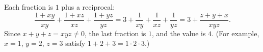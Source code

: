 Each fraction is $1$ plus a reciprocal:
\[
\dfrac{1+xy}{xy}+\dfrac{1+xz}{xz}+\dfrac{1+yz}{yz}=3+\dfrac{1}{xy}+\dfrac{1}{xz}+\dfrac{1}{yz}=3+\dfrac{z+y+x}{xyz}.
\]
Since $x+y+z=xyz\ne0$, the last fraction is $1$, and the value is $\boxed{4}$. (For example, $x=1$, $y=2$, $z=3$ satisfy $1+2+3=1\cdot2\cdot3$.)

